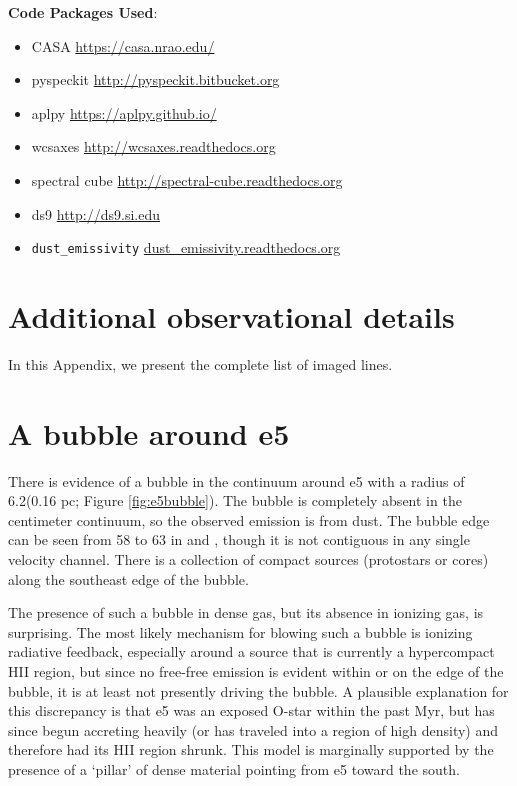 \documentclass{emulateapj}
\begin{document}
\textbf{Code Packages Used}:

\begin{itemize}
    \item CASA \url{https://casa.nrao.edu/}
    \item pyspeckit \url{http://pyspeckit.bitbucket.org} \citet{Ginsburg2011c}
    \item aplpy \url{https://aplpy.github.io/}
    \item wcsaxes \url{http://wcsaxes.readthedocs.org}
    \item spectral cube \url{http://spectral-cube.readthedocs.org}
    \item ds9 \url{http://ds9.si.edu}
    \item \texttt{dust\_emissivity} \url{dust_emissivity.readthedocs.org}
\end{itemize}




\appendix

\section{Additional observational details}
In this Appendix, we present the complete list of imaged lines.



%
%
%
%
%
%
%

\section{A bubble around e5}
\label{sec:e5bubble}
There is evidence of a bubble in the continuum around e5 with a radius of
6.2\arcsec (0.16 pc; Figure \ref{fig:e5bubble}).  The bubble is completely
absent in the centimeter continuum, so the observed emission is from dust.  The
bubble edge can be seen from 58 \kms to 63 \kms in \ceighteeno and
\formaldehyde, though it is not contiguous in any single velocity channel.
There is a collection of compact sources (protostars or cores) along the
southeast edge of the bubble.

The presence of such a bubble in dense gas, but its absence in ionizing gas, is
surprising.  The most likely mechanism for blowing such a bubble is ionizing
radiative feedback, especially around a source that is currently a hypercompact
HII region, but since no free-free emission is evident within or on the edge of
the bubble, it is at least not presently driving the bubble.  A plausible
explanation for this discrepancy is that e5 was an exposed O-star within the
past Myr, but has since begun accreting heavily (or has traveled into a region
of high density) and therefore had its HII
region shrunk.  This model is marginally supported by the presence of a `pillar'
of dense material pointing from e5 toward the south.
\end{document}
